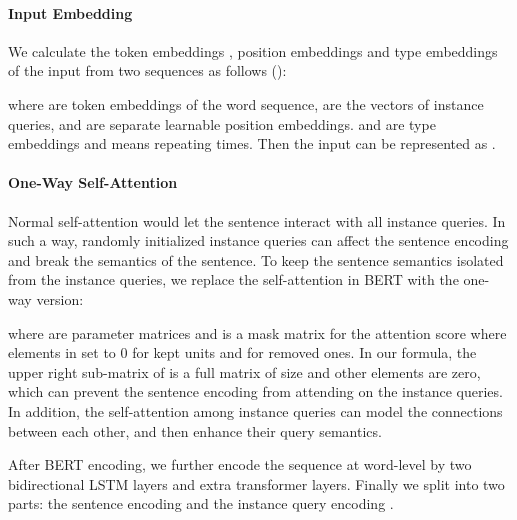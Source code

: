 \documentclass[11pt]{article}
\begin{document}
\paragraph{Input Embedding} We calculate the token embeddings , position embeddings  and type embeddings  of the input from two sequences as follows ():







\noindent where  are token embeddings of the word sequence,  are the vectors of instance queries,  and  are separate learnable position embeddings.  and  are type embeddings and  means repeating  times. Then the input can be represented as .




\paragraph{One-Way Self-Attention} 

Normal self-attention would let the sentence interact with all instance queries. In such a way, randomly initialized instance queries can affect the sentence encoding and break the semantics of the sentence.
To keep the sentence semantics isolated from the instance queries,
we replace the self-attention in BERT \citep{devlin-etal-2019-bert} with the one-way version:














\noindent where  are parameter matrices and  is a mask matrix for the attention score where elements in  set to 0 for kept units and  for removed ones. In our formula, the upper right sub-matrix of  is a full  matrix of size  and other elements are zero, which can prevent the sentence encoding from attending on the instance queries.
In addition, the self-attention among instance queries can model the connections between each other, and then enhance their query semantics.










After BERT encoding, we further encode the sequence at word-level by two bidirectional LSTM layers and  extra transformer layers. Finally we split  into  two parts: the sentence encoding  and the instance query encoding .
\end{document}
